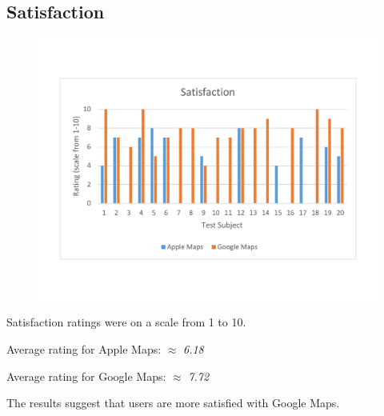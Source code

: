 \documentclass[a4paper; 11pt]{article}
\begin{document}
\subsection{Satisfaction}
\begin{figure}[ht]
\begin{center}
\includegraphics[keepaspectratio, width=.8\textwidth ]{satisfaction.pdf}
\end{center}
\end{figure}
\par
Satisfaction ratings were on a scale from 1 to 10.
\par
Average rating for Apple Maps: $ \approx $ \textit{6.18}
\par
Average rating for Google Maps: $ \approx $ \textit{7.72}
\par
The results suggest that users are more satisfied with Google Maps.
\end{document}
